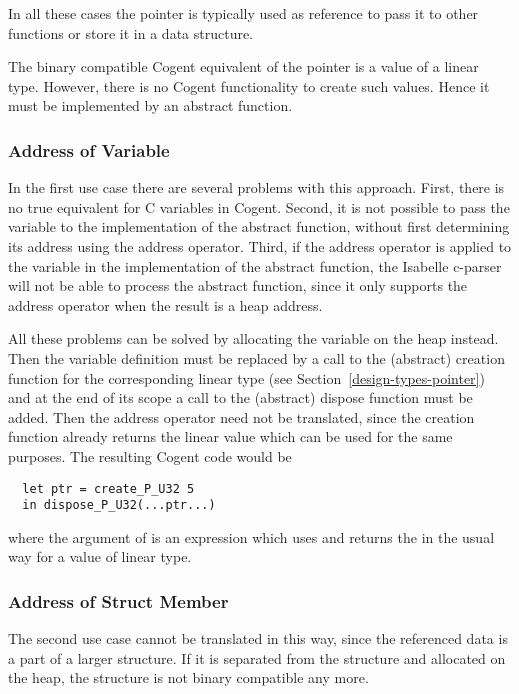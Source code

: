 In all these cases the pointer is typically used as reference to pass it to other functions or store it
in a data structure.

The binary compatible Cogent equivalent of the pointer is a value of a linear type. However, there is
no Cogent functionality to create such values. Hence it must be implemented by an abstract function.

\subsubsection{Address of Variable}

In the first use case there are several problems with this approach. First, there is no true equivalent
for C variables in Cogent. Second, it is not possible to pass the variable to the implementation of the
abstract function, without first determining its address using the address operator. Third, if the address
operator is applied to the variable in the implementation of the abstract function, the Isabelle c-parser
will not be able to process the abstract function, since it only supports the address operator when 
the result is a heap address.

All these problems can be solved by allocating the variable on the heap instead. Then the variable definition
must be replaced by a call to the (abstract) creation function for the corresponding linear type 
(see Section~\ref{design-types-pointer}) and 
at the end of its scope a call to the (abstract) dispose function must be added. Then the address
operator need not be translated, since the creation function already returns the linear value which can be 
used for the same purposes. The resulting Cogent code would be
\begin{verbatim}
  let ptr = create_P_U32 5
  in dispose_P_U32(...ptr...)
\end{verbatim}
where the argument of  is an expression which uses and returns the  in the 
usual way for a value of linear type.

\subsubsection{Address of Struct Member}

The second use case cannot be translated in this way, since the referenced data is a part of a larger structure.
If it is separated from the structure and allocated on the heap, the structure is not binary compatible any more.


